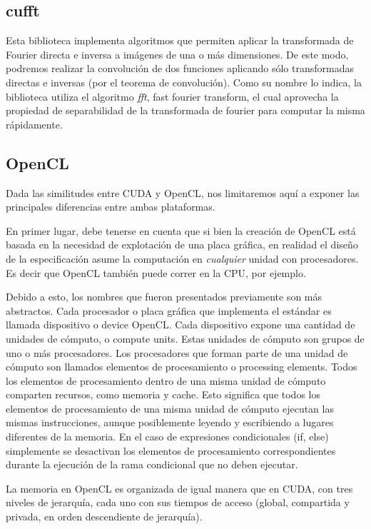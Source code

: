 \subsection{cufft}
Esta biblioteca implementa algoritmos que permiten aplicar la transformada de Fourier directa e inversa a im\'agenes de una o m\'as dimensiones.
De este modo, podremos realizar la convoluci\'on de dos funciones aplicando s\'olo transformadas directas e inversas (por el teorema de convoluci\'on).
Como su nombre lo indica, la biblioteca utiliza el algoritmo {\em fft}, fast fourier transform, el cual aprovecha la propiedad de separabilidad de la transformada de fourier para computar la misma rápidamente.


\subsection{OpenCL}
Dada las similitudes entre CUDA y OpenCL, nos limitaremos aquí a exponer las principales diferencias entre ambas plataformas.

En primer lugar, debe tenerse en cuenta que si bien la creación de OpenCL está basada en la necesidad de explotación de una placa gráfica, en realidad el diseño de la especificación asume la computación en {\em cualquier} unidad con procesadores.
Es decir que OpenCL también puede correr en la CPU, por ejemplo.

Debido a esto, los nombres que fueron presentados previamente son más abstractos.
Cada procesador o placa gráfica que implementa el estándar es llamada dispositivo o device OpenCL. Cada dispositivo expone una cantidad de unidades de cómputo, o compute units. Estas unidades de cómputo son grupos de uno o más procesadores.
Los procesadores que forman parte de una unidad de cómputo son llamados elementos
de procesamiento o processing elements.
Todos los elementos de procesamiento dentro de una misma unidad de cómputo comparten recursos, como memoria y cache.
Esto significa que todos los elementos de procesamiento de una misma unidad de cómputo ejecutan las mismas instrucciones, aunque posiblemente leyendo y escribiendo a lugares diferentes de la memoria. En el caso de expresiones condicionales (if, else) simplemente se desactivan los elementos de procesamiento correspondientes durante la ejecución de la rama condicional que no deben ejecutar.

La memoria en OpenCL es organizada de igual manera que en CUDA, con tres niveles de jerarquía, cada uno con sus tiempos de acceso (global, compartida y privada, en orden descendiente de jerarquía).

